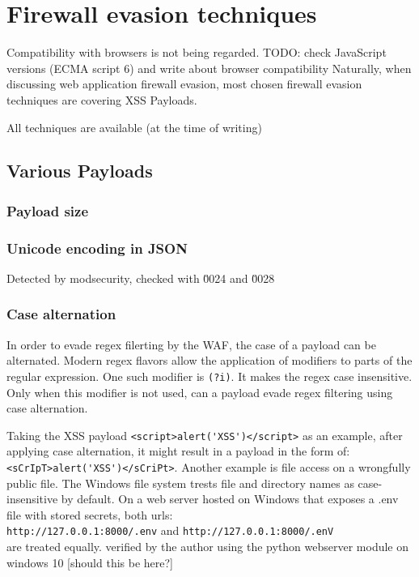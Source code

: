 \section{Firewall evasion techniques}

Compatibility with browsers is not being regarded. {\color{red} TODO: check JavaScript versions (ECMA script 6) and write about browser compatibility}
Naturally, when discussing web application firewall evasion, most chosen firewall evasion techniques are covering XSS Payloads.

All techniques are available {\color{red}(at the time of writing)}

\subsection{Various Payloads}

\subsubsection{Payload size}

\subsubsection{Unicode encoding in JSON}
Detected by modsecurity, checked with \u0024 and \u0028

\subsubsection{Case alternation}
In order to evade regex filerting by the WAF, the case of a payload can be alternated. \cite{medium/allypetitt}
Modern regex flavors allow the application of modifiers to parts of the regular expression.
One such modifier is \verb|(?i)|. It makes the regex case insensitive. \cite{regex/jan} Only when this modifier is not used, can a payload evade regex filtering using case alternation.

Taking the XSS payload \verb|<script>alert('XSS')</script>| as an example, after applying case alternation, it might result in a payload in the form of: \verb|<sCrIpT>alert('XSS')</sCriPt>|.
Another example is file access on a wrongfully public file.
The Windows file system trests file and directory names as case-insensitive by default. \cite{windows/casesensitive}
On a web server hosted on Windows that exposes a .env file with stored secrets, both urls: \\ \verb|http://127.0.0.1:8000/.env| and \verb|http://127.0.0.1:8000/.enV| \\
are treated equally. {\color{blue} verified by the author using the python webserver module on windows 10 [should this be here?]}


